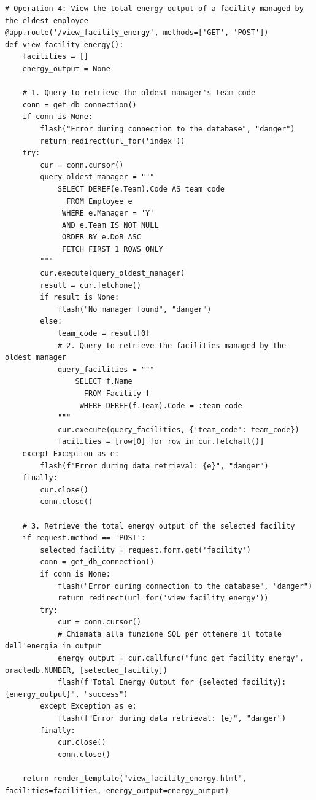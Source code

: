 \begin{lstlisting}
# Operation 4: View the total energy output of a facility managed by the eldest employee
@app.route('/view_facility_energy', methods=['GET', 'POST'])
def view_facility_energy():
    facilities = []
    energy_output = None

    # 1. Query to retrieve the oldest manager's team code
    conn = get_db_connection()
    if conn is None:
        flash("Error during connection to the database", "danger")
        return redirect(url_for('index'))
    try:
        cur = conn.cursor()
        query_oldest_manager = """
            SELECT DEREF(e.Team).Code AS team_code
              FROM Employee e
             WHERE e.Manager = 'Y'
             AND e.Team IS NOT NULL
             ORDER BY e.DoB ASC
             FETCH FIRST 1 ROWS ONLY
        """
        cur.execute(query_oldest_manager)
        result = cur.fetchone()
        if result is None:
            flash("No manager found", "danger")
        else:
            team_code = result[0]
            # 2. Query to retrieve the facilities managed by the oldest manager
            query_facilities = """
                SELECT f.Name 
                  FROM Facility f
                 WHERE DEREF(f.Team).Code = :team_code
            """
            cur.execute(query_facilities, {'team_code': team_code})
            facilities = [row[0] for row in cur.fetchall()]
    except Exception as e:
        flash(f"Error during data retrieval: {e}", "danger")
    finally:
        cur.close()
        conn.close()

    # 3. Retrieve the total energy output of the selected facility
    if request.method == 'POST':
        selected_facility = request.form.get('facility')
        conn = get_db_connection()
        if conn is None:
            flash("Error during connection to the database", "danger")
            return redirect(url_for('view_facility_energy'))
        try:
            cur = conn.cursor()
            # Chiamata alla funzione SQL per ottenere il totale dell'energia in output
            energy_output = cur.callfunc("func_get_facility_energy", oracledb.NUMBER, [selected_facility])
            flash(f"Total Energy Output for {selected_facility}: {energy_output}", "success")
        except Exception as e:
            flash(f"Error during data retrieval: {e}", "danger")
        finally:
            cur.close()
            conn.close()

    return render_template("view_facility_energy.html", facilities=facilities, energy_output=energy_output)


\end{lstlisting}
